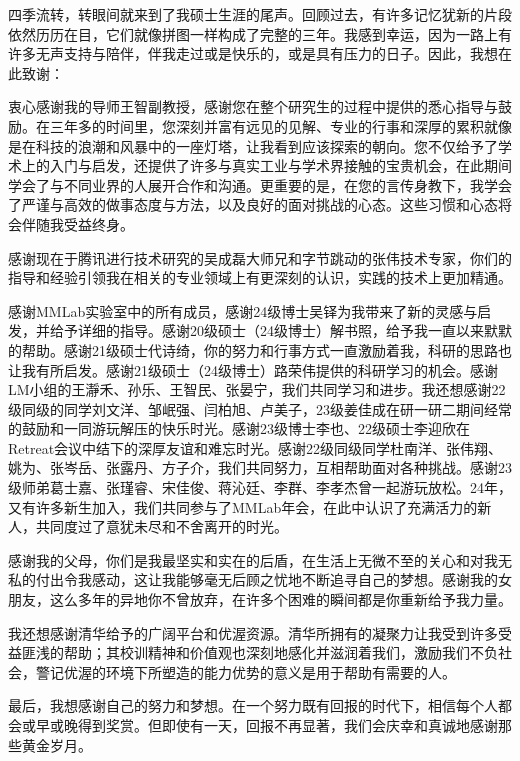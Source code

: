 
\begin{acknowledgements}
四季流转，转眼间就来到了我硕士生涯的尾声。回顾过去，有许多记忆犹新的片段依然历历在目，它们就像拼图一样构成了完整的三年。我感到幸运，因为一路上有许多无声支持与陪伴，伴我走过或是快乐的，或是具有压力的日子。因此，我想在此致谢：

衷心感谢我的导师王智副教授，感谢您在整个研究生的过程中提供的悉心指导与鼓励。在三年多的时间里，您深刻并富有远见的见解、专业的行事和深厚的累积就像是在科技的浪潮和风暴中的一座灯塔，让我看到应该探索的朝向。您不仅给予了学术上的入门与启发，还提供了许多与真实工业与学术界接触的宝贵机会，在此期间学会了与不同业界的人展开合作和沟通。更重要的是，在您的言传身教下，我学会了严谨与高效的做事态度与方法，以及良好的面对挑战的心态。这些习惯和心态将会伴随我受益终身。

感谢现在于腾讯进行技术研究的吴成磊大师兄和字节跳动的张伟技术专家，你们的指导和经验引领我在相关的专业领域上有更深刻的认识，实践的技术上更加精通。

感谢MMLab实验室中的所有成员，感谢24级博士吴铎为我带来了新的灵感与启发，并给予详细的指导。感谢20级硕士（24级博士）解书照，给予我一直以来默默的帮助。感谢21级硕士代诗绮，你的努力和行事方式一直激励着我，科研的思路也让我有所启发。感谢21级硕士（24级博士）路荣伟提供的科研学习的机会。感谢LM小组的王瀞禾、孙乐、王智民、张晏宁，我们共同学习和进步。我还想感谢22级同级的同学刘文洋、邹岷强、闫柏旭、卢美子，23级姜佳成在研一研二期间经常的鼓励和一同游玩解压的快乐时光。感谢23级博士李也、22级硕士李迎欣在Retreat会议中结下的深厚友谊和难忘时光。感谢22级同级同学杜南洋、张伟翔、姚为、张岑岳、张露丹、方子介，我们共同努力，互相帮助面对各种挑战。感谢23级师弟葛士嘉、张瑾睿、宋佳俊、蒋沁廷、李群、李孝杰曾一起游玩放松。24年，又有许多新生加入，我们共同参与了MMLab年会，在此中认识了充满活力的新人，共同度过了意犹未尽和不舍离开的时光。

感谢我的父母，你们是我最坚实和实在的后盾，在生活上无微不至的关心和对我无私的付出令我感动，这让我能够毫无后顾之忧地不断追寻自己的梦想。感谢我的女朋友，这么多年的异地你不曾放弃，在许多个困难的瞬间都是你重新给予我力量。

我还想感谢清华给予的广阔平台和优渥资源。清华所拥有的凝聚力让我受到许多受益匪浅的帮助；其校训精神和价值观也深刻地感化并滋润着我们，激励我们不负社会，警记优渥的环境下所塑造的能力优势的意义是用于帮助有需要的人。

最后，我想感谢自己的努力和梦想。在一个努力既有回报的时代下，相信每个人都会或早或晚得到奖赏。但即使有一天，回报不再显著，我们会庆幸和真诚地感谢那些黄金岁月。


\end{acknowledgements}
